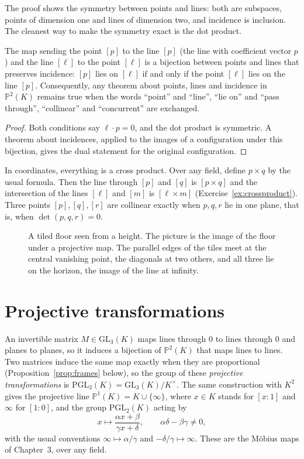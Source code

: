 The proof shows the symmetry between points and lines: both are subspaces, points of dimension one and lines of dimension two, and incidence is
inclusion. The cleanest way to make the symmetry exact is the dot product.

\begin{theorem}[Duality]\label{thm:duality}
The map sending the point $[p]$ to the line $[p]$ (the line with coefficient vector $p$) and the line $[\ell]$ to the point $[\ell]$ is a bijection
between points and lines that preserves incidence: $[p]$ lies on $[\ell]$ if and only if the point $[\ell]$ lies on the line $[p]$. Consequently,
any theorem about points, lines and incidence in $\mathbb P^2(K)$ remains true when the words ``point'' and ``line'', ``lie on'' and ``pass
through'', ``collinear'' and ``concurrent'' are exchanged.
\end{theorem}

\begin{proof}
Both conditions say $\ell\cdot p=0$, and the dot product is symmetric. A theorem about incidences, applied to the images of a configuration
under this bijection, gives the dual statement for the original configuration.
\end{proof}

In coordinates, everything is a cross product. Over any field, define $p\times q$ by the usual formula. Then the line through $[p]$ and $[q]$ is
$[p\times q]$ and the intersection of the lines $[\ell]$ and $[m]$ is $[\ell\times m]$ (Exercise~\ref{ex:crossproduct}). Three points $[p],[q],[r]$
are collinear exactly when $p,q,r$ lie in one plane, that is, when $\det(p,q,r)=0$.

\begin{figure}[ht]
\centering
{}
\caption{A tiled floor seen from a height. The picture is the image of the floor under a projective map. The parallel edges of the tiles
meet at the central vanishing point, the diagonals at two others, and all three lie on the horizon, the image of the line at infinity.}
\label{fig:floor}
\end{figure}

\section{Projective transformations}

An invertible matrix $M\in\mathrm{GL}_3(K)$ maps lines through $0$ to lines through $0$ and planes to planes, so it induces a bijection of
$\mathbb P^2(K)$ that maps lines to lines. Two matrices induce the same map exactly when they are proportional (Proposition~\ref{prop:frames}
below), so the group of these \emph{projective transformations} is $\mathrm{PGL}_3(K)=\mathrm{GL}_3(K)/K^\times$. The same construction with
$K^2$ gives the projective line $\mathbb P^1(K)=K\cup\{\infty\}$, where $x\in K$ stands for $[x:1]$ and $\infty$ for $[1:0]$, and the group
$\mathrm{PGL}_2(K)$ acting by
\[
x\longmapsto \frac{\alpha x+\beta}{\gamma x+\delta},\qquad \alpha\delta-\beta\gamma\ne0,
\]
with the usual conventions $\infty\mapsto\alpha/\gamma$ and $-\delta/\gamma\mapsto\infty$. These are the M\"obius maps of Chapter~3, over any
field.

